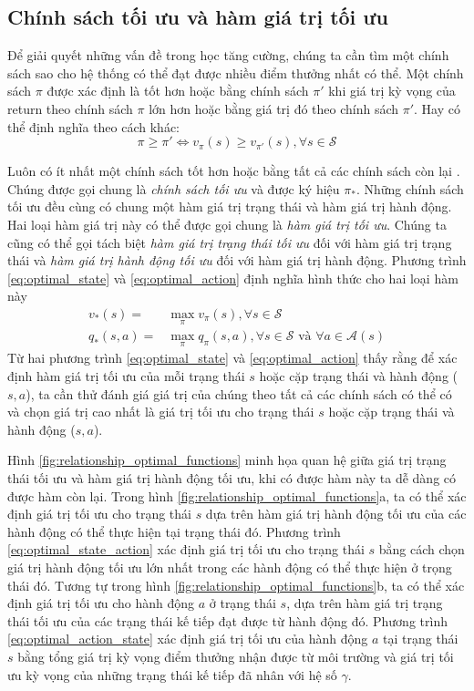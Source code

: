 \subsection{Chính sách tối ưu và hàm giá trị tối ưu}
Để giải quyết những vấn đề trong học tăng cường, chúng ta cần tìm một chính sách sao cho hệ thống có thể đạt được nhiều điểm thưởng nhất có thể. Một chính sách $\pi$ được xác định là tốt hơn hoặc bằng chính sách $\pi'$ khi giá trị kỳ vọng của return theo chính sách $\pi$ lớn hơn hoặc bằng giá trị đó theo chính sách $\pi'$. Hay có thể định nghĩa theo cách khác:
\begin{equation}
\pi \geq \pi' \Longleftrightarrow v_{\pi}(s) \geq v_{\pi'}(s), \forall s \in \mathcal{S}
\end{equation}

Luôn có ít nhất một chính sách tốt hơn hoặc bằng tất cả các chính sách còn lại \cite{sutton1998introduction}. Chúng được gọi chung là \textit{chính sách tối ưu} và được ký hiệu $\pi_{*}$. Những chính sách tối ưu đều cùng có chung một hàm giá trị trạng thái và hàm giá trị hành động. Hai loại hàm giá trị này có thể được gọi chung là \textit{hàm giá trị tối ưu}. Chúng ta cũng có thể gọi tách biệt \textit{hàm giá trị trạng thái tối ưu} đối với hàm giá trị trạng thái và \textit{hàm giá trị hành động tối ưu} đối với hàm giá trị hành động. Phương trình \ref{eq:optimal_state} và \ref{eq:optimal_action} định nghĩa hình thức cho hai loại hàm này
\begin{align}
v_{*}(s) = {} & \max_{\pi}v_{\pi}(s), \forall s \in \mathcal{S} \label{eq:optimal_state} \\
q_{*}(s,a) = {} & \max_{\pi}q_{\pi}(s,a), \forall s \in \mathcal{S} \text{ và } \forall a \in \mathcal{A}(s) \label{eq:optimal_action}
\end{align}
Từ hai phương trình \ref{eq:optimal_state} và \ref{eq:optimal_action} thấy rằng để xác định hàm giá trị tối ưu của mỗi trạng thái $s$ hoặc cặp trạng thái và hành động ($s,a$), ta cần thử đánh giá giá trị của chúng theo tất cả các chính sách có thể có và chọn giá trị cao nhất là giá trị tối ưu cho trạng thái $s$ hoặc cặp trạng thái và hành động ($s,a$).

Hình \ref{fig:relationship_optimal_functions} minh họa quan hệ giữa giá trị trạng thái tối ưu và hàm giá trị hành động tối ưu, khi có được hàm này ta dễ dàng có được hàm còn lại. Trong hình \ref{fig:relationship_optimal_functions}a, ta có thể xác định giá trị tối ưu cho trạng thái $s$ dựa trên hàm giá trị hành động tối ưu của các hành động có thể thực hiện tại trạng thái đó. Phương trình \ref{eq:optimal_state_action} xác định giá trị tối ưu cho trạng thái $s$ bằng cách chọn giá trị hành động tối ưu lớn nhất trong các hành động có thể thực hiện ở trọng thái đó. Tương tự trong hình \ref{fig:relationship_optimal_functions}b, ta có thể xác định giá trị tối ưu cho hành động $a$ ở trạng thái $s$, dựa trên hàm giá trị trạng thái tối ưu của các trạng thái kế tiếp đạt được từ hành động đó. Phương trình \ref{eq:optimal_action_state} xác định giá trị tối ưu của hành động $a$ tại trạng thái $s$ bằng tổng giá trị kỳ vọng điểm thưởng nhận được từ môi trường và giá trị tối ưu kỳ vọng của những trạng thái kế tiếp đã nhân với hệ số $\gamma$.

